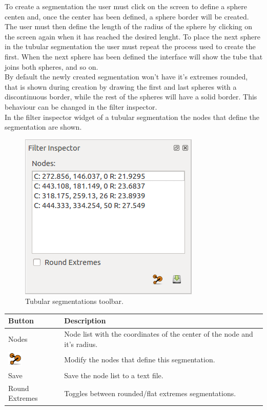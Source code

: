 To create a segmentation the user must click on the screen to define a sphere centen and, once the center
has been defined, a sphere border will be created. The user must then define the length of the radius of the 
sphere by clicking on the screen again when it has reached the desired lenght. To place the next sphere in
the tubular segmentation the user must repeat the process used to create the first. When the next sphere has
been defined the interface will show the tube that joins both spheres, and so on. \\
By default the newly created segmentation won't have it's extremes rounded, that is shown during creation by
drawing the first and last spheres with a discontinuous border, while the rest of the spheres will have a
solid border. This behaviour can be changed in the filter inspector. \\

In the filter inspector widget of a tubular segmentation the nodes that define the segmentation are shown.\\

\begin{figure}[H]
\centering
\includegraphics[scale=0.75]{fig/plugin-ts-inspector.png}
\caption{Tubular segmentations toolbar.}
\end{figure}

\begin{tabular}{| m{1.3cm} | m{12cm} |}
\hline
\textbf{Button} & \textbf{Description}\\
\hline
Nodes & Node list with the coordinates of the center of the node and it's radius.\\
\hline
\includegraphics[width=0.7cm]{fig/tubular} & Modify the nodes that define this segmentation.\\
\hline
Save & Save the node list to a text file.\\
\hline
Round Extremes & Toggles between rounded/flat extremes segmentations.\\
\hline
\end{tabular}
\vspace{0.3cm} 

